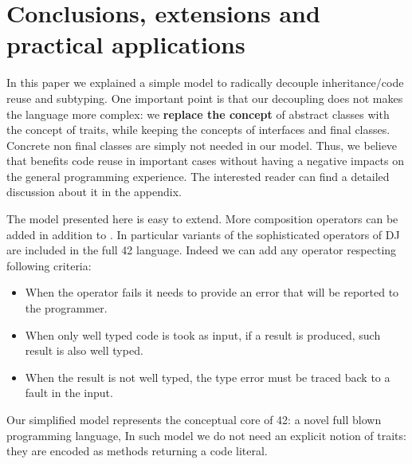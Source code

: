 \saveSpace\saveSpace
\section{Conclusions, extensions and practical applications}
\saveSpace
In this paper we explained a simple model to 
radically decouple inheritance/code reuse and subtyping.
One important point is that our decoupling does not
makes the language more complex:
we \textbf{replace the concept} of abstract classes with
the concept of traits, while keeping the concepts of
interfaces and final classes.
Concrete non final classes are simply not needed in our model.
Thus, we believe that \name benefits
code reuse in important cases 
without having a negative impacts on the general programming experience.
The interested reader can find a detailed discussion about it in the appendix.


The model presented here is easy to extend.
More composition operators can be added in addition to \use.
In particular variants of the sophisticated operators of DJ are
included in the full 42 language.
 Indeed we can add any operator respecting following criteria:

\begin{itemize}
\item When the operator fails it needs to provide an error that will be reported to the programmer.
\item When only well typed code is took as input, if a result is produced,
 such result is also well typed.
\item When the result is not well typed,
the type error must be traced back to
a fault in the input.
 \end{itemize}
 

Our simplified model represents the conceptual core of  42: a novel full blown programming language,
In such model we do not need an explicit notion of traits: they are encoded as methods returning a code literal.

\begin{comment}
using the ideas presented in this paper to obtain reliable and understandable metaprogramming.
Formalization (in progress) for full 42 can be found at
\url{http://}\footnote{Omitted for anonymous review}. 
42 extends our model allowing
flattening to execute arbitrary computations.
In such model we do not need an explicit notion of traits: they are encoded as methods returning a code literal.
42 also has features less related to code composition, like
  a strong type system supporting aliasing mutability and circularity control,
   checked exceptions, and errors (unchecked exceptions) with strong-exception-safety.


42 do not have a finite set of composition operators; they can be
added using the built in support for native method calls. They can
be dynamically checked to verify that they are well behaved
according to our predicate, or they can be trusted to achieve
efficiency.
\end{comment}

